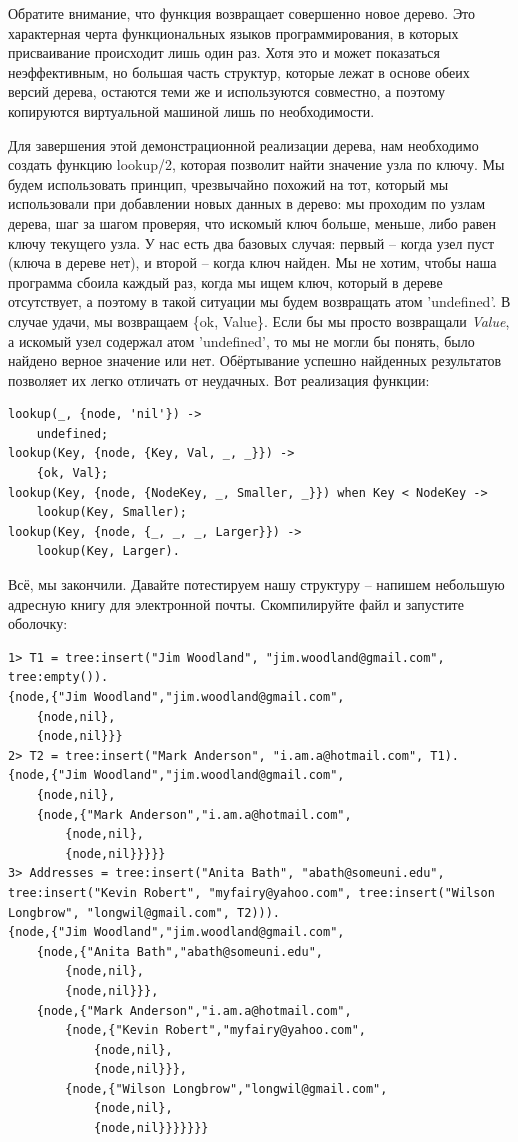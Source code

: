 \documentclass[a4paper,12pt]{report}
\newcommand{\ops}{\colorbox{lgreen}}
\begin{document}
Обратите внимание, что функция возвращает совершенно новое дерево. Это характерная черта функциональных языков программирования, в которых присваивание происходит лишь один раз. Хотя это и может показаться неэффективным, но большая часть структур, которые лежат в основе обеих версий дерева, остаются теми же и используются совместно, а поэтому копируются виртуальной машиной лишь по необходимости.

Для завершения этой демонстрационной реализации дерева, нам необходимо создать функцию \ops{lookup/2}, которая позволит найти значение узла по ключу. Мы будем использовать принцип, чрезвычайно похожий на тот, который мы использовали при добавлении новых данных в дерево: мы проходим по узлам дерева, шаг за шагом проверяя, что искомый ключ больше, меньше, либо равен ключу текущего узла. У нас есть два базовых случая: первый \--- когда узел пуст (ключа в дереве нет), и второй \--- когда ключ найден. Мы не хотим, чтобы наша программа сбоила каждый раз, когда мы ищем ключ, который в дереве отсутствует, а поэтому в такой ситуации мы будем возвращать атом 'undefined'. В случае удачи, мы возвращаем \ops{\{ok, Value\}}. Если бы мы просто возвращали \emph{Value}, а искомый узел содержал атом 'undefined', то мы не могли бы понять, было найдено верное значение или нет. Обёртывание успешно найденных результатов позволяет их легко отличать от неудачных. Вот реализация функции:
\begin{lstlisting}[style=erlang]
lookup(_, {node, 'nil'}) ->
    undefined;
lookup(Key, {node, {Key, Val, _, _}}) ->
    {ok, Val};
lookup(Key, {node, {NodeKey, _, Smaller, _}}) when Key < NodeKey ->
    lookup(Key, Smaller);
lookup(Key, {node, {_, _, _, Larger}}) ->
    lookup(Key, Larger).
\end{lstlisting}

Всё, мы закончили. Давайте потестируем нашу структуру \--- напишем небольшую адресную книгу для электронной почты. Скомпилируйте файл и запустите оболочку:
\begin{lstlisting}[style=erlang]
1> T1 = tree:insert("Jim Woodland", "jim.woodland@gmail.com", tree:empty()).
{node,{"Jim Woodland","jim.woodland@gmail.com",
    {node,nil},
    {node,nil}}}
2> T2 = tree:insert("Mark Anderson", "i.am.a@hotmail.com", T1).
{node,{"Jim Woodland","jim.woodland@gmail.com",
    {node,nil},
    {node,{"Mark Anderson","i.am.a@hotmail.com",
        {node,nil},
        {node,nil}}}}}
3> Addresses = tree:insert("Anita Bath", "abath@someuni.edu", tree:insert("Kevin Robert", "myfairy@yahoo.com", tree:insert("Wilson Longbrow", "longwil@gmail.com", T2))).
{node,{"Jim Woodland","jim.woodland@gmail.com",
    {node,{"Anita Bath","abath@someuni.edu",
        {node,nil},
        {node,nil}}},
    {node,{"Mark Anderson","i.am.a@hotmail.com",
        {node,{"Kevin Robert","myfairy@yahoo.com",
            {node,nil},
            {node,nil}}},
        {node,{"Wilson Longbrow","longwil@gmail.com",
            {node,nil},
            {node,nil}}}}}}}
\end{lstlisting}
\end{document}
